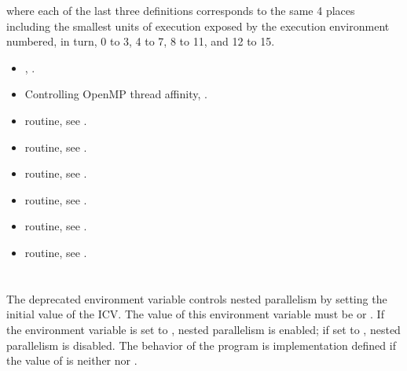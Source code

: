 where each of the last three definitions corresponds to the same 4 places including the 
smallest units of execution exposed by the execution environment numbered, in turn, 0 
to 3, 4 to 7, 8 to 11, and 12 to 15. 

\crossreferences
\begin{itemize}
\item {}, .

\item Controlling OpenMP thread affinity, .

\item {} routine, see .

\item {} routine, see .

\item {} routine, see .

\item {} routine, see .

\item {} routine, see .

\item {} routine, see .
\end{itemize}










\section{}
\label{sec:OMP_NESTED}
The deprecated  environment variable controls nested parallelism by setting the 
initial value of the  ICV. The value of this environment variable must be  
or . If the environment variable is set to , nested parallelism is enabled; if 
set to , nested parallelism is disabled. The behavior of the program is 
implementation defined if the value of  is neither  nor .

